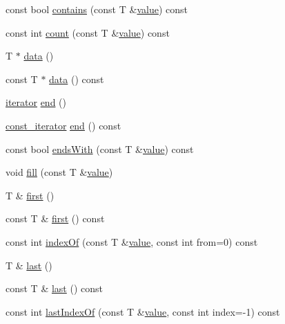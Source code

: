 \begin{DoxyCompactItemize}
\item 
const bool \hyperlink{classprism_1_1_array_ab1dbaaa25fdd52114ecf83764d07dd32}{contains} (const T \&\hyperlink{classprism_1_1_array_a2c5690996975510eed7112066b936d8f}{value}) const 
\item 
const int \hyperlink{classprism_1_1_array_a17090694f8652c186aef26882a387c05}{count} (const T \&\hyperlink{classprism_1_1_array_a2c5690996975510eed7112066b936d8f}{value}) const 
\item 
T $\ast$ \hyperlink{classprism_1_1_array_a6d53be4d71c511149f3639a7f14863b8}{data} ()
\item 
const T $\ast$ \hyperlink{classprism_1_1_array_a5b28a077a7db27fc8c2c4fed1f20c3a9}{data} () const 
\item 
\hyperlink{classprism_1_1_array_a6814c2af67e8b3fc48b02319f5e63d50}{iterator} \hyperlink{classprism_1_1_array_afca59b5cf554b93d97b3e4d131d7d964}{end} ()
\item 
\hyperlink{classprism_1_1_array_ab78c83a88959a72d59e5f930540be94a}{const\+\_\+iterator} \hyperlink{classprism_1_1_array_a630f7f0c9e70d7bd86b093723c068b1f}{end} () const 
\item 
const bool \hyperlink{classprism_1_1_array_a8f8ecd4d34589f7cbc28d6f14fd3de9a}{ends\+With} (const T \&\hyperlink{classprism_1_1_array_a2c5690996975510eed7112066b936d8f}{value}) const 
\item 
void \hyperlink{classprism_1_1_array_a366f1c9b89d2133171a0ed2bb54534ce}{fill} (const T \&\hyperlink{classprism_1_1_array_a2c5690996975510eed7112066b936d8f}{value})
\item 
T \& \hyperlink{classprism_1_1_array_a342f29ffb8147cca71c204777bca5b2e}{first} ()
\item 
const T \& \hyperlink{classprism_1_1_array_abf7cb06917a0bea41a0c260da91227a5}{first} () const 
\item 
const int \hyperlink{classprism_1_1_array_aa3eca6ff8f386eed2ddfcf615e1f4bc1}{index\+Of} (const T \&\hyperlink{classprism_1_1_array_a2c5690996975510eed7112066b936d8f}{value}, const int from=0) const 
\item 
T \& \hyperlink{classprism_1_1_array_ae3d2272f0b2fec20a3a59746454871e6}{last} ()
\item 
const T \& \hyperlink{classprism_1_1_array_ab651f9c888450cc836e8b9586bbe2776}{last} () const 
\item 
const int \hyperlink{classprism_1_1_array_ae9d7ba407484ba1d2beea39c300a48de}{last\+Index\+Of} (const T \&\hyperlink{classprism_1_1_array_a2c5690996975510eed7112066b936d8f}{value}, const int index=-\/1) const 

\end{DoxyCompactItemize}
